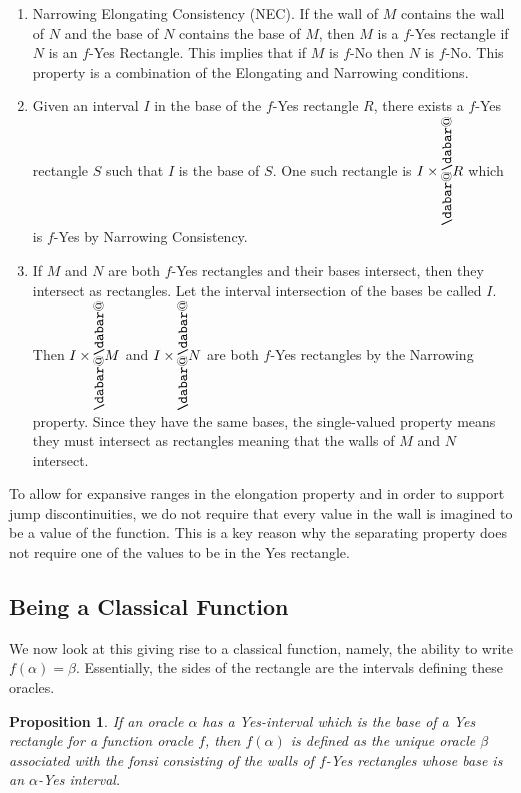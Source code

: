 \documentclass[12pt]{article}
\makeatletter
\newtheorem{proposition}{Proposition}[subsection]
\theoremstyle{remark}
\newcommand*\dln{\rotatebox[origin=c]{90}{$\dabar@\dabar@$}}
\newcommand{\wall}[1]{\dln #1}
\makeatother
\begin{document}
\begin{enumerate}
    \item Narrowing Elongating Consistency (NEC). If the wall of $M$ contains the wall of $N$ and the base of $N$ contains the base of $M$, then $M$ is a $f$-Yes rectangle if $N$  is an $f$-Yes Rectangle. This implies that if $M$ is $f$-No then $N$ is $f$-No. This property is a combination of the Elongating and Narrowing conditions. 

    \item Given an interval $I$ in the base of the $f$-Yes rectangle $R$, there exists a $f$-Yes rectangle $S$ such that $I$ is the base of $S$. One such rectangle is $I \times \wall{R}$ which is $f$-Yes by Narrowing Consistency. 

    \item If $M$ and $N$ are both $f$-Yes rectangles and their bases intersect, then they intersect as rectangles. Let the interval intersection of the bases be called $I$. Then $I\times \wall{M}$  and $I \times \wall{N}$ are both $f$-Yes rectangles by the Narrowing property. Since they have the same bases, the single-valued property means they must intersect as rectangles meaning that the walls of $M$ and $N$ intersect. 

\end{enumerate}

To allow for expansive ranges in the elongation property and in order to support jump discontinuities, we do not require that every value in the wall is imagined to be a value of the function. This is a key reason why the separating property does not require one of the values to be in the Yes rectangle. 


\subsection{Being a Classical Function}

We now look at this giving rise to a classical function, namely, the ability to write $f(\alpha) = \beta$. Essentially, the sides of the rectangle are the intervals defining these oracles.  

\begin{proposition}
If an oracle $\alpha$ has a Yes-interval which is the base of a Yes rectangle for a function oracle $f$, then $f(\alpha)$ is defined as the unique oracle $\beta$ associated with the fonsi consisting of the walls of $f$-Yes rectangles whose base is an $\alpha$-Yes interval. 
\end{proposition}
\end{document}
